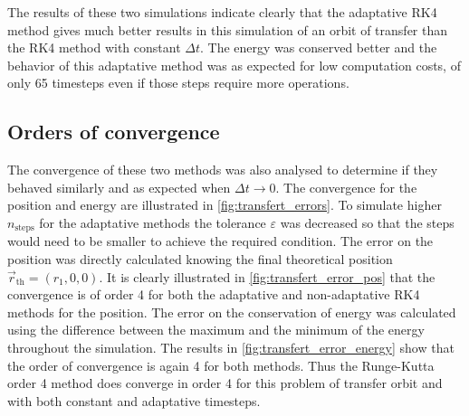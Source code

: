The results of these two simulations indicate clearly that the adaptative RK4 method gives much better results in this simulation of an orbit of transfer than the RK4 method with constant $\Delta t$. The energy was conserved better and the behavior of this adaptative method was as expected for low computation costs, of only 65 timesteps even if those steps require more operations.

\subsection{Orders of convergence}
The convergence of these two methods was also analysed to determine if they behaved similarly and as expected when $\Delta t \to 0$. The convergence for the position and energy are illustrated in \autoref{fig:transfert_errors}. To simulate higher $n_\mathrm{steps}$ for the adaptative methods the tolerance $\varepsilon$ was decreased so that the steps would need to be smaller to achieve the required condition. The error on the position was directly calculated knowing the final theoretical position $\vec{r}_\mathrm{th} = \left(r_1, 0, 0\right)$. It is clearly illustrated in \autoref{fig:transfert_error_pos} that the convergence is of order 4 for both the adaptative and non-adaptative RK4 methods for the position. The error on the conservation of energy was calculated using the difference between the maximum and the minimum of the energy throughout the simulation. The results in \autoref{fig:transfert_error_energy} show that the order of convergence is again 4 for both methods. Thus the Runge-Kutta order 4 method does converge in order 4 for this problem of transfer orbit and with both constant and adaptative timesteps.

